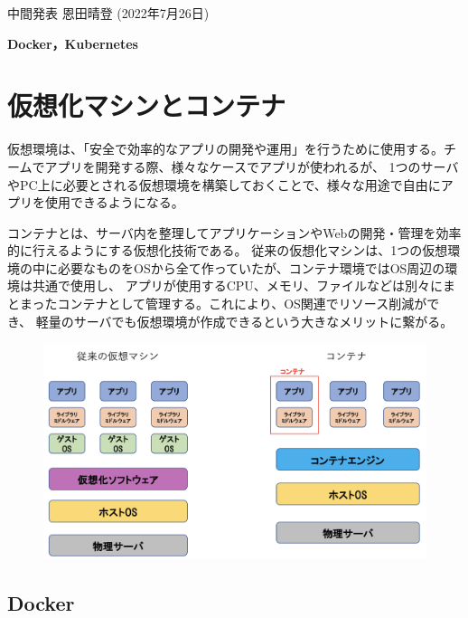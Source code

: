 \documentclass[11pt]{jarticle}
\begin{document}
\begin{flushleft}
  中間発表\hspace{\fill}
  恩田晴登 (2022年7月26日)
\end{flushleft}
\begin{center}
{\Large\bf Docker，Kubernetes}
\end{center}

\section{仮想化マシンとコンテナ}

仮想環境は、「安全で効率的なアプリの開発や運用」を行うために使用する。チームでアプリを開発する際、様々なケースでアプリが使われるが、
1つのサーバやPC上に必要とされる仮想環境を構築しておくことで、様々な用途で自由にアプリを使用できるようになる。

コンテナとは、サーバ内を整理してアプリケーションやWebの開発・管理を効率的に行えるようにする仮想化技術である。
従来の仮想化マシンは、1つの仮想環境の中に必要なものをOSから全て作っていたが、コンテナ環境ではOS周辺の環境は共通で使用し、
アプリが使用するCPU、メモリ、ファイルなどは別々にまとまったコンテナとして管理する。これにより、OS関連でリソース削減ができ、
軽量のサーバでも仮想環境が作成できるという大きなメリットに繋がる。

\begin{figure}[ht]
  \centering
  \includegraphics[keepaspectratio, scale=0.25]{container.png}
\end{figure}

\subsection{Docker}
\end{document}
